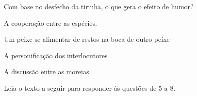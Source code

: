 Com base no desfecho da tirinha, o que gera o efeito de humor?

\begin{escolha}
\item A cooperação entre as espécies.
\item Um peixe se alimentar de restos na boca de outro peixe
\item A personificação dos interlocutores
\item A discussão entre as moreias.
\end{escolha}



\noindent Leia o texto a seguir para responder às questões de 5 a 8.

